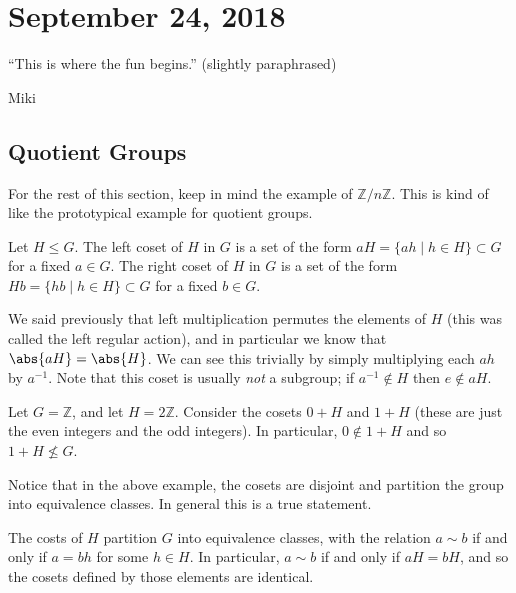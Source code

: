 \section{September 24, 2018}

\epigraph{``This is where the fun begins.'' (slightly paraphrased)}{Miki}

\subsection{Quotient Groups}

For the rest of this section, keep in mind the example of $\mathbb{Z}/n\mathbb{Z}$. This is kind of like the prototypical example for quotient groups.

\begin{definition}[Coset]
Let $H \leq G$. The left coset of $H$ in $G$ is a set of the form $aH = \{ah \mid h \in H\} \subset G$ for a fixed $a \in G$. The right coset of $H$ in $G$ is a set of the form $Hb = \{hb \mid h \in H\} \subset G$ for a fixed $b \in G$.
\end{definition}

We said previously that left multiplication permutes the elements of $H$ (this was called the left regular action), and in particular we know that $\abs{aH} = \abs{H}$. We can see this trivially by simply multiplying each $ah$ by $a^{-1}$. Note that this coset is usually \emph{not} a subgroup; if $a^{-1} \notin H$ then $e \notin aH$.

\begin{example}
Let $G = \mathbb{Z}$, and let $H = 2\mathbb{Z}$. Consider the cosets $0 + H$ and $1 + H$ (these are just the even integers and the odd integers). In particular, $0 \notin 1 + H$ and so $1 + H \not\leq G$.
\end{example}

Notice that in the above example, the cosets are disjoint and partition the group into equivalence classes. In general this is a true statement.

\begin{lemma}
The costs of $H$ partition $G$ into equivalence classes, with the relation $a \sim b$ if and only if $a = bh$ for some $h \in H$. In particular, $a \sim b$ if and only if $aH = bH$, and so the cosets defined by those elements are identical.
\end{lemma}

